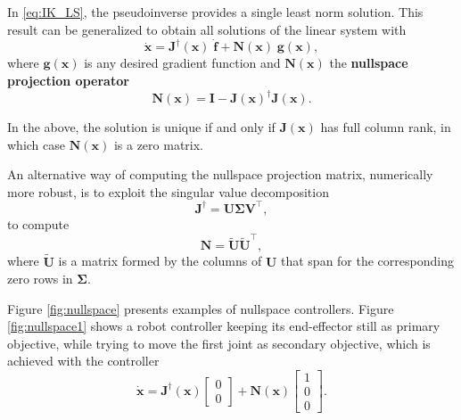 \documentclass[10pt,a4paper]{article} %
\newcommand{\trsp}{{\scriptscriptstyle\top}}
\newcommand{\psin}{{\dagger}}
\begin{document}
In \eqref{eq:IK_LS}, the pseudoinverse provides a single least norm solution. This result can be generalized to obtain all solutions of the linear system with
\begin{equation}
	\bm{\dot{\bm{x}}} = \bm{J}^\psin\!(\bm{x}) \; \bm{\dot{f}} + \bm{N}\!(\bm{x}) \; \bm{g}(\bm{x}),
	\label{eq:IK_nullspace}
\end{equation}
where $\bm{g}(\bm{x})$ is any desired gradient function and $\bm{N}\!(\bm{x})$ the \textbf{nullspace projection operator}
\begin{equation*}
	\bm{N}\!(\bm{x}) = \bm{I} - \bm{J}(\bm{x})^\psin \bm{J}(\bm{x}). 
\end{equation*}

In the above, the solution is unique if and only if $\bm{J}(\bm{x})$ has full column rank, in which case $\bm{N}(\bm{x})$ is a zero matrix. 

An alternative way of computing the nullspace projection matrix, numerically more robust, is to exploit the singular value decomposition
\begin{equation*}
  \bm{J}^\psin\!=\!\bm{U}\bm{\Sigma}\bm{V}^\trsp,
\end{equation*}
to compute
\begin{equation*}
  \bm{N} = \bm{\tilde{U}} \bm{\tilde{U}}^\trsp,
\end{equation*}
where $\bm{\tilde{U}}$ is a matrix formed by the columns of $\bm{U}$ that span for the corresponding zero rows in $\bm{\Sigma}$.

Figure \ref{fig:nullspace} presents examples of nullspace controllers. Figure \ref{fig:nullspace1} shows a robot controller keeping its end-effector still as primary objective, while trying to move the first joint as secondary objective, which is achieved with the controller 
\begin{equation*}
	\bm{\dot{\bm{x}}} = \bm{J}^\psin\!(\bm{x}) \!\begin{bmatrix}0\\0\end{bmatrix} + \bm{N}\!(\bm{x}) \!\begin{bmatrix}1\\0\\0\end{bmatrix}.
\end{equation*}
\end{document}
